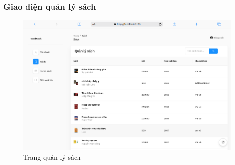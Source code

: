 \subsubsection{Giao diện quản lý sách}
\begin{figure}[H]
  \centering
  \includegraphics[width=1\textwidth]{report/images/admin/sach.png}
  \caption{Trang quản lý sách}
\end{figure}
 